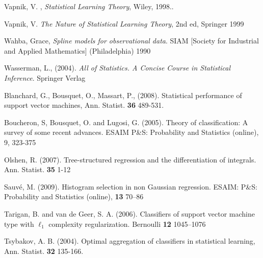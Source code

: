 \documentclass[11pt,twoside]{article}%
\theoremstyle{change}
\begin{document}
\begin{thebibliography}{9999}
Vapnik, V. , \textsl{Statistical Learning Theory}, Wiley, 1998..

Vapnik, V. \textsl{The Nature of Statistical Learning
Theory}, 2nd ed, Springer 1999

Wahba, Grace, \textsl{Spline models for observational data}.
SIAM [Society for Industrial and Applied Mathematics] (Philadelphia) 1990

Wasserman, L., (2004). \textsl{All of Statistics. A Concise
Course in Statistical Inference}. Springer Verlag

Blanchard, G., Bousquet, O., Massart, P.,
(2008). Statistical performance of support vector machines, Ann. Statist.
\textbf{36} 489-531.

Boucheron, S, Bousquet, O. and Lugosi, G. (2005).
Theory of classification: A survey of some recent advances. ESAIM P\&S:
Probability and Statistics (online), 9, 323-375

Olshen, R. (2007). Tree-structured regression and the
differentiation of integrals. Ann. Statist. \textbf{35} 1-12

Sauv\'{e}, M. (2009). Histogram selection in non Gaussian
regression. ESAIM: P\&S: Probability and Statistics (online), \textbf{13 }70--86

Tarigan, B. and van de Geer, S. A. (2006).
Classifiers of support vector machine type with $\ell_{1}$ complexity
regularization. Bernoulli \textbf{12} 1045--1076

Tsybakov, A. B. (2004). Optimal aggregation of
classifiers in statistical learning, Ann. Statist. \textbf{32} 135-166.
\end{thebibliography}
\end{document}

